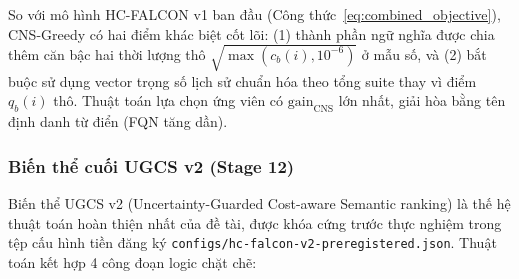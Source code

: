 So với mô hình HC-FALCON v1 ban đầu (Công thức~\eqref{eq:combined_objective}), CNS-Greedy có hai điểm khác biệt cốt lõi: (1) thành phần ngữ nghĩa được chia thêm căn bậc hai thời lượng thô $\sqrt{\max(c_b(i), 10^{-6})}$ ở mẫu số, và (2) bắt buộc sử dụng vector trọng số lịch sử chuẩn hóa theo tổng suite thay vì điểm $q_b(i)$ thô. Thuật toán lựa chọn ứng viên có $\text{gain}_{\text{CNS}}$ lớn nhất, giải hòa bằng tên định danh từ điển (FQN tăng dần).

\subsubsection{Biến thể cuối UGCS v2 (Stage 12)}
\label{subsubsec:ugcs_v2}

Biến thể UGCS v2 (Uncertainty-Guarded Cost-aware Semantic ranking) là thế hệ thuật toán hoàn thiện nhất của đề tài, được khóa cứng trước thực nghiệm trong tệp cấu hình tiền đăng ký \texttt{configs/hc-falcon-v2-preregistered.json}. Thuật toán kết hợp 4 công đoạn logic chặt chẽ:

